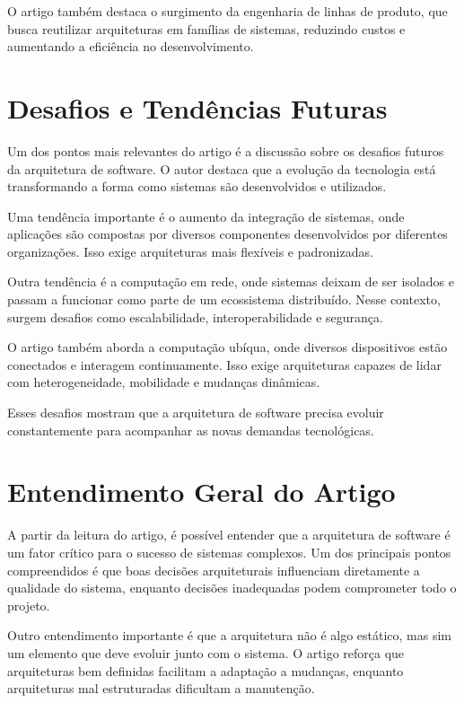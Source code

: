 \documentclass[conference]{IEEEtran}
\begin{document}
O artigo também destaca o surgimento da engenharia de linhas de produto, que busca reutilizar arquiteturas em famílias de sistemas, reduzindo custos e aumentando a eficiência no desenvolvimento.

\section{Desafios e Tendências Futuras}

Um dos pontos mais relevantes do artigo é a discussão sobre os desafios futuros da arquitetura de software. O autor destaca que a evolução da tecnologia está transformando a forma como sistemas são desenvolvidos e utilizados.

Uma tendência importante é o aumento da integração de sistemas, onde aplicações são compostas por diversos componentes desenvolvidos por diferentes organizações. Isso exige arquiteturas mais flexíveis e padronizadas.

Outra tendência é a computação em rede, onde sistemas deixam de ser isolados e passam a funcionar como parte de um ecossistema distribuído. Nesse contexto, surgem desafios como escalabilidade, interoperabilidade e segurança.

O artigo também aborda a computação ubíqua, onde diversos dispositivos estão conectados e interagem continuamente. Isso exige arquiteturas capazes de lidar com heterogeneidade, mobilidade e mudanças dinâmicas.

Esses desafios mostram que a arquitetura de software precisa evoluir constantemente para acompanhar as novas demandas tecnológicas.

\section{Entendimento Geral do Artigo}

A partir da leitura do artigo, é possível entender que a arquitetura de software é um fator crítico para o sucesso de sistemas complexos. Um dos principais pontos compreendidos é que boas decisões arquiteturais influenciam diretamente a qualidade do sistema, enquanto decisões inadequadas podem comprometer todo o projeto.

Outro entendimento importante é que a arquitetura não é algo estático, mas sim um elemento que deve evoluir junto com o sistema. O artigo reforça que arquiteturas bem definidas facilitam a adaptação a mudanças, enquanto arquiteturas mal estruturadas dificultam a manutenção.
\end{document}
